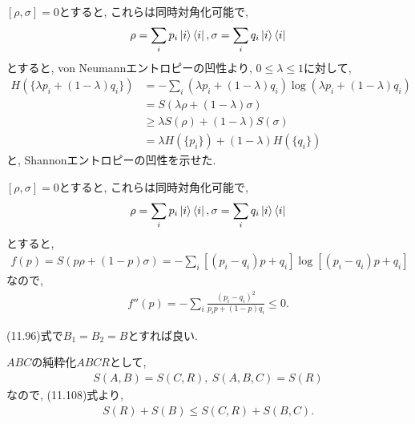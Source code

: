 \begin{ex}
    \label{ex11.21}
    $[ \rho , \sigma] = 0$とすると, これらは同時対角化可能で,
    \begin{align*}
        \rho = \sum_i p_i \ket{i} \bra{i},
        \sigma = \sum_i q_i \ket{i} \bra{i}
    \end{align*}
    とすると, von Neumannエントロピーの凹性より, $0 \le \lambda \le 1$に対して,
    \begin{align*}
        H( \{ \lambda p_i + (1 - \lambda) q_i\})
         & =
        - \sum_{i} \left( \lambda p_i + (1 - \lambda) q_i \right) \log \left( \lambda p_i + (1 - \lambda) q_i \right)
        \\
         & =S( \lambda \rho + (1 - \lambda) \sigma)
        \\
         & \geq
        \lambda S (\rho) + (1- \lambda) S(\sigma)
        \\
         & =
        \lambda H (\{ p_i \}) + (1- \lambda) H(\{ q_i\})
    \end{align*}
    と, Shannonエントロピーの凹性を示せた.
\end{ex}

\begin{ex}
    \label{ex11.22}
    $[ \rho , \sigma] = 0$とすると, これらは同時対角化可能で,
    \begin{align*}
        \rho = \sum_i p_i \ket{i} \bra{i},
        \sigma = \sum_i q_i \ket{i} \bra{i}
    \end{align*}
    とすると,
    \begin{align*}
        f(p)
        = S(p \rho + (1-p)\sigma)
        = - \sum_i
        \left[ \left( p_i - q_i \right) p + q_i \right]
        \log \left[  \left( p_i - q_i \right) p + q_i \right]
    \end{align*}
    なので,
    \begin{align*}
        f''(p) = - \sum_i \frac{ (p_i - q_i)^2 }{p_i p + (1-p)q_i} \leq 0.
    \end{align*}
\end{ex}

\begin{ex}
    \label{ex11.23}
    (11.96)式で$B_1 = B_2 = B$とすれば良い.
\end{ex}

\begin{ex}
    \label{ex11.24}
    $ABC$の純粋化$ABCR$として,
    \begin{align*}
        S(A,B) = S(C,R) , \ S(A,B,C) = S(R)
    \end{align*}
    なので, (11.108)式より,
    \begin{align*}
        S(R) + S(B) \le S(C,R) + S(B,C).
    \end{align*}
\end{ex}

